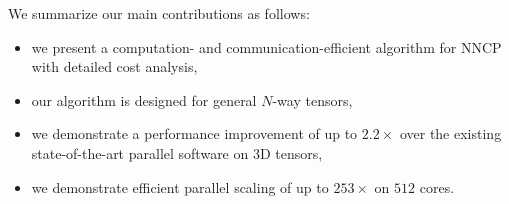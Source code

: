 We summarize our main contributions as follows:
\begin{itemize}
		\item we present a computation- and communication-efficient algorithm for NNCP with detailed cost analysis,
		\item our algorithm is designed for general $N$-way tensors,
		\item we demonstrate a performance improvement of up to $2.2\times$ over the existing state-of-the-art parallel software on 3D tensors,
		\item we demonstrate efficient parallel scaling of up to $253\times$ on $512$ cores.
\end{itemize}